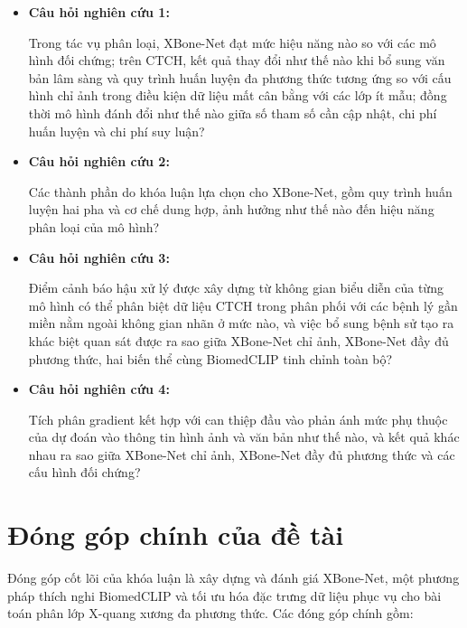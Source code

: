 \begin{itemize}
\item \textbf{Câu hỏi nghiên cứu 1:} 

Trong tác vụ phân loại, XBone-Net đạt mức hiệu năng nào so với các mô hình đối chứng; trên CTCH, kết quả thay đổi như thế nào khi bổ sung văn bản lâm sàng và quy trình huấn luyện đa phương thức tương ứng so với cấu hình chỉ ảnh trong điều kiện dữ liệu mất cân bằng với các lớp ít mẫu; đồng thời mô hình đánh đổi như thế nào giữa số tham số cần cập nhật, chi phí huấn luyện và chi phí suy luận?

\item \textbf{Câu hỏi nghiên cứu 2:} 

Các thành phần do khóa luận lựa chọn cho XBone-Net, gồm quy trình huấn luyện hai pha và cơ chế dung hợp, ảnh hưởng như thế nào đến hiệu năng phân loại của mô hình?

\item \textbf{Câu hỏi nghiên cứu 3:} 

Điểm cảnh báo hậu xử lý được xây dựng từ không gian biểu diễn của từng mô hình có thể phân biệt dữ liệu CTCH trong phân phối với các bệnh lý gần miền nằm ngoài không gian nhãn ở mức nào, và việc bổ sung bệnh sử tạo ra khác biệt quan sát được ra sao giữa XBone-Net chỉ ảnh, XBone-Net đầy đủ phương thức, hai biến thể cùng BiomedCLIP tinh chỉnh toàn bộ?

\item \textbf{Câu hỏi nghiên cứu 4:} 

Tích phân gradient kết hợp với can thiệp đầu vào phản ánh mức phụ thuộc của dự đoán vào thông tin hình ảnh và văn bản như thế nào, và kết quả khác nhau ra sao giữa XBone-Net chỉ ảnh, XBone-Net đầy đủ phương thức và các cấu hình đối chứng?

\end{itemize}

\section{Đóng góp chính của đề tài}

Đóng góp cốt lõi của khóa luận là xây dựng và đánh giá XBone-Net, một phương pháp thích nghi BiomedCLIP và tối ưu hóa đặc trưng dữ liệu phục vụ cho bài toán phân lớp X-quang xương đa phương thức. Các đóng góp chính gồm:

